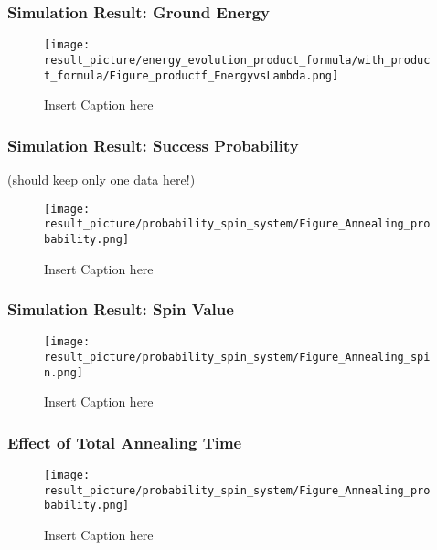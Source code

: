 \documentclass{beamer}
\begin{document}

\begin{frame}
	\frametitle{Simulation Result: Ground Energy}
	\begin{figure}
		\centering
		\texttt{[image: result\_picture/energy\_evolution\_product\_formula/with\_product\_formula/Figure\_productf\_EnergyvsLambda.png]}
		\caption{Insert Caption here}
	\end{figure}
\end{frame}

\begin{frame}
	\frametitle{Simulation Result: Success Probability}
	(should keep only one data here!)
	\begin{figure}
		\centering
		\texttt{[image: result\_picture/probability\_spin\_system/Figure\_Annealing\_probability.png]}

		\caption{Insert Caption here}
	\end{figure}
\end{frame}

\begin{frame}
	\frametitle{Simulation Result: Spin Value}
	\begin{figure}
		\centering
		\texttt{[image: result\_picture/probability\_spin\_system/Figure\_Annealing\_spin.png]}
		\caption{Insert Caption here}
	\end{figure}
\end{frame}

\begin{frame}
	\frametitle{Effect of Total Annealing Time}
	\begin{figure}
		\centering
		\texttt{[image: result\_picture/probability\_spin\_system/Figure\_Annealing\_probability.png]}
		
		\caption{Insert Caption here}
	\end{figure}
\end{frame}
\end{document}
